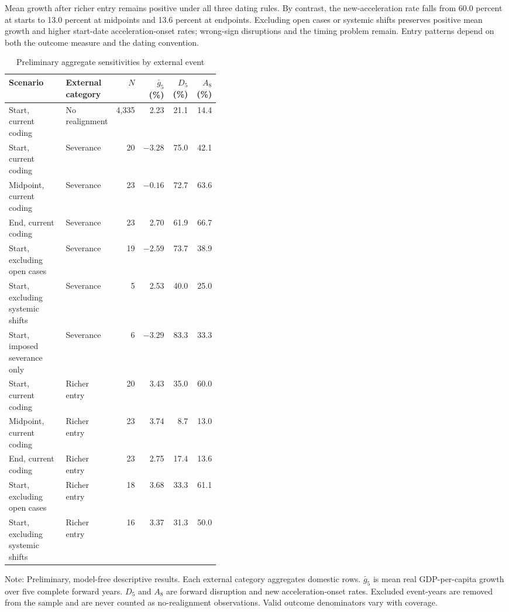 \documentclass[11pt]{article}
\begin{document}
Mean growth after richer entry remains positive under all three dating rules. By contrast, the new-acceleration rate falls from 60.0 percent at starts to 13.0 percent at midpoints and 13.6 percent at endpoints. Excluding open cases or systemic shifts preserves positive mean growth and higher start-date acceleration-onset rates; wrong-sign disruptions and the timing problem remain. Entry patterns depend on both the outcome measure and the dating convention.

\begin{table}[!ht]
\centering
\begin{threeparttable}
\caption{Preliminary aggregate sensitivities by external event}
\label{tab:prelim_sensitivity}
\small
\begin{tabular}{@{}p{0.27\linewidth}p{0.15\linewidth}rrrr@{}}
\toprule
Scenario & External category & $N$ & $\bar g_5$ (\%) & $D_5$ (\%) & $A_8$ (\%) \\
\midrule
Start, current coding & No realignment & 4,335 & 2.23 & 21.1 & 14.4 \\
Start, current coding & Severance & 20 & $-3.28$ & 75.0 & 42.1 \\
Midpoint, current coding & Severance & 23 & $-0.16$ & 72.7 & 63.6 \\
End, current coding & Severance & 23 & 2.70 & 61.9 & 66.7 \\
Start, excluding open cases & Severance & 19 & $-2.59$ & 73.7 & 38.9 \\
Start, excluding systemic shifts & Severance & 5 & 2.53 & 40.0 & 25.0 \\
Start, imposed severance only & Severance & 6 & $-3.29$ & 83.3 & 33.3 \\
\midrule
Start, current coding & Richer entry & 20 & 3.43 & 35.0 & 60.0 \\
Midpoint, current coding & Richer entry & 23 & 3.74 & 8.7 & 13.0 \\
End, current coding & Richer entry & 23 & 2.75 & 17.4 & 13.6 \\
Start, excluding open cases & Richer entry & 18 & 3.68 & 33.3 & 61.1 \\
Start, excluding systemic shifts & Richer entry & 16 & 3.37 & 31.3 & 50.0 \\
\bottomrule
\end{tabular}
\begin{tablenotes}
\small
\item Note: Preliminary, model-free descriptive results. Each external category aggregates domestic rows. $\bar g_5$ is mean real GDP-per-capita growth over five complete forward years. $D_5$ and $A_8$ are forward disruption and new acceleration-onset rates. Excluded event-years are removed from the sample and are never counted as no-realignment observations. Valid outcome denominators vary with coverage.
\end{tablenotes}
\end{threeparttable}
\end{table}
\end{document}
